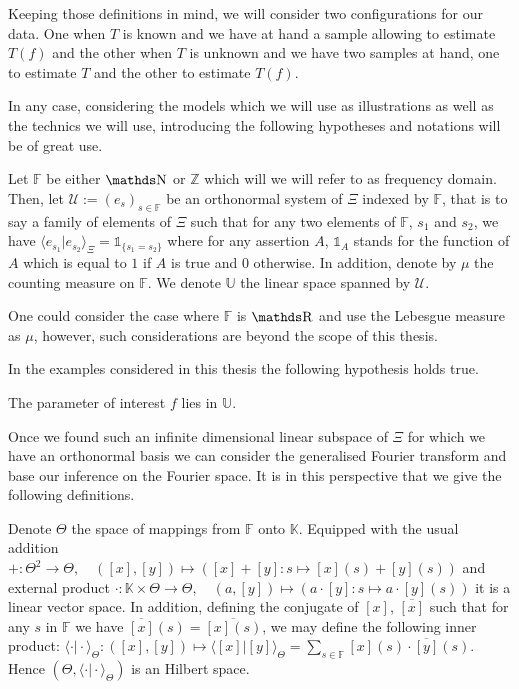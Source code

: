 Keeping those definitions in mind, we will consider two configurations for our data.
One when $T$ is known and we have at hand a sample allowing to estimate $T(f)$ and the other when $T$ is unknown and we have two samples at hand, one to estimate $T$ and the other to estimate $T(f)$.

In any case, considering the models which we will use as illustrations as well as the technics we will use, introducing the following hypotheses and notations will be of great use.

\begin{de}
Let $\mathds{F}$ be either $\N$ or $\mathds{Z}$ which will we will refer to as frequency domain.
Then, let $\mathcal{U} := (e_{s})_{s \in \mathds{F}}$ be an orthonormal system of $\Xi$ indexed by $\mathds{F}$, that is to say a family of elements of $\Xi$ such that for any two elements of $\mathds{F}$, $s_{1}$ and $s_{2}$, we have $\langle e_{s_{1}} \vert e_{s_{2}} \rangle_{\Xi} = \mathds{1}_{\{s_{1} = s_{2}\}}$ where for any assertion $A$, $\mathds{1}_{A}$ stands for the function of $A$ which is equal to $1$ if $A$ is true and $0$ otherwise.
In addition, denote by $\mu$ the counting measure on $\mathds{F}$.
We denote $\mathds{U}$ the linear space spanned by $\mathcal{U}$.
\assEnd
\end{de}

\begin{rmk}
One could consider the case where $\mathds{F}$ is $\R$ and use the Lebesgue measure as $\mu$, however, such considerations are beyond the scope of this thesis.
\end{rmk}

In the examples considered in this thesis the following hypothesis holds true.

\begin{as}
The parameter of interest $f$ lies in $\mathds{U}$.
\assEnd
\end{as}


Once we found such an infinite dimensional linear subspace of $\Xi$ for which we have an orthonormal basis we can consider the generalised Fourier transform and base our inference on the Fourier space.
It is in this perspective that we give the following definitions.

\begin{de}
Denote $\Theta$ the space of mappings from $\mathds{F}$ onto $\mathds{K}$.
Equipped with the usual addition $+ : \Theta^{2} \rightarrow \Theta, \quad ([x], [y]) \mapsto ([x] + [y]: s \mapsto [x](s) + [y](s))$ and external product $\cdot : \mathds{K} \times \Theta \rightarrow \Theta, \quad(a, [y]) \mapsto (a \cdot [y]: s \mapsto a \cdot [y](s))$ it is a linear vector space.
In addition, defining the conjugate of $[x]$, $\overline{[x]}$ such that for any $s$ in $\mathds{F}$ we have $\overline{[x]}(s) = \overline{[x](s)}$, we may define the following inner product: $\langle \cdot \vert \cdot \rangle_{\Theta} : ([x], [y]) \mapsto \langle [x] \vert [y] \rangle_{\Theta} = \sum_{s \in \mathds{F}} [x](s) \cdot \overline{[y]}(s)$.
Hence $(\Theta, \langle \cdot \vert \cdot \rangle_{\Theta})$ is an Hilbert space.
\assEnd
\end{de}

